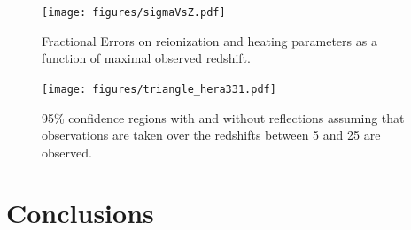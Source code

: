 \documentclass[onecolumn]{emulateapj}
\begin{document}
\begin{figure}
\texttt{[image: figures/sigmaVsZ.pdf]}
\caption{Fractional Errors on reionization and heating parameters as a function of maximal observed redshift.}
\end{figure}

\begin{figure}
\texttt{[image: figures/triangle\_hera331.pdf]}
\caption{95\% confidence regions with and without reflections assuming that observations are taken over the redshifts between 5 and 25 are observed.}
\end{figure}


\section{Conclusions}
\label{sec:Conclusion}



\appendix
\end{document}
